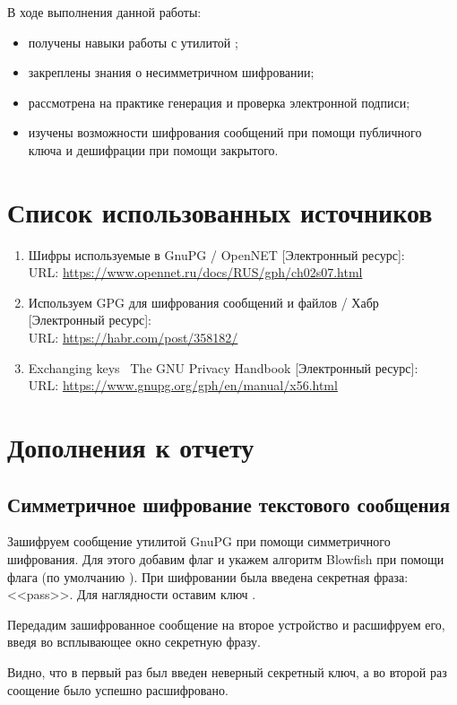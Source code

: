 В ходе выполнения данной работы:

\begin{itemize}
	\item получены навыки работы с утилитой ;
	\item закреплены знания о несимметричном шифровании;
	\item рассмотрена на практике генерация и проверка электронной подписи;
	\item изучены возможности шифрования сообщений при помощи публичного ключа и дешифрации при помощи закрытого. 
\end{itemize}

\section*{Список использованных источников}

\begin{enumerate}
	\item Шифры используемые в GnuPG / OpenNET [Электронный ресурс]:\\
	URL: {\small\url{https://www.opennet.ru/docs/RUS/gph/ch02s07.html}}
	\item Используем GPG для шифрования сообщений и файлов / Хабр [Электронный ресурс]:\\
		URL: {\small\url{https://habr.com/post/358182/}}
	\item Exchanging keys \ The GNU Privacy Handbook [Электронный ресурс]:\\
		URL: {\small\url{https://www.gnupg.org/gph/en/manual/x56.html}}
\end{enumerate}

\section*{Дополнения к отчету}

\subsection*{Симметричное шифрование текстового сообщения}

Зашифруем сообщение утилитой GnuPG при помощи симметричного шифрования. Для этого добавим флаг  и укажем алгоритм Blowfish при помощи флага  (по умолчанию ). При шифровании была введена секретная фраза: <<pass>>. Для наглядности оставим ключ . 



Передадим зашифрованное сообщение на второе устройство и расшифруем его, введя во всплывающее окно секретную фразу.



Видно, что в первый раз был введен неверный секретный ключ, а во второй раз соощение было успешно расшифровано.


